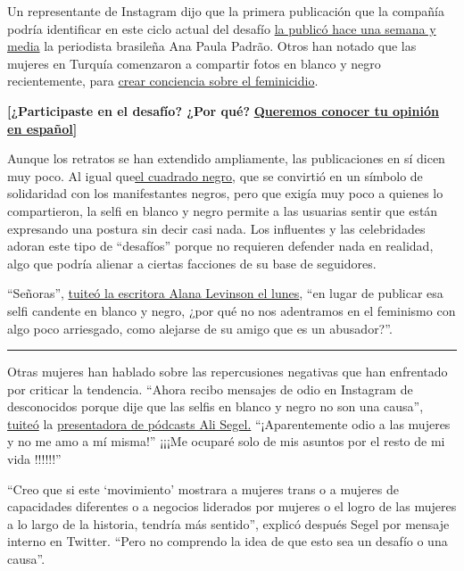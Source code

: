 Un representante de Instagram dijo que la primera publicación que la
compañía podría identificar en este ciclo actual del desafío
\href{https://www.instagram.com/p/CCxGfzTBmXP/}{la publicó hace una
semana y media} la periodista brasileña Ana Paula Padrão. Otros han
notado que las mujeres en Turquía comenzaron a compartir fotos en blanco
y negro recientemente, para
\href{https://twitter.com/imaann_patel/status/1288080743198068736?s=21}{crear
conciencia sobre el feminicidio}.

\textbf{{[}¿Participaste en el desafío? ¿Por qué?}
\textbf{\href{https://www.nytimes.com/es/2020/07/28/espanol/estilos-de-vida/reto-selfi-blanco-negro.html\#commentsContainer}{Queremos
conocer tu opinión en español{]}}}

Aunque los retratos se han extendido ampliamente, las publicaciones en
sí dicen muy poco. Al igual
que\href{https://www.nytimes.com/2020/06/02/arts/music/what-blackout-tuesday.html}{el
cuadrado negro}, que se convirtió en un símbolo de solidaridad con los
manifestantes negros, pero que exigía muy poco a quienes lo
compartieron, la selfi en blanco y negro permite a las usuarias sentir
que están expresando una postura sin decir casi nada. Los influentes y
las celebridades adoran este tipo de ``desafíos'' porque no requieren
defender nada en realidad, algo que podría alienar a ciertas facciones
de su base de seguidores.

``Señoras'',
\href{https://twitter.com/alanalevinson/status/1287818379818971136}{tuiteó
la escritora Alana Levinson el lunes}, ``en lugar de publicar esa selfi
candente en blanco y negro, ¿por qué no nos adentramos en el feminismo
con algo poco arriesgado, como alejarse de su amigo que es un
abusador?''.

\begin{center}\rule{0.5\linewidth}{\linethickness}\end{center}

Otras mujeres han hablado sobre las repercusiones negativas que han
enfrentado por criticar la tendencia. ``Ahora recibo mensajes de odio en
Instagram de desconocidos porque dije que las selfis en blanco y negro
no son una causa'',
\href{https://twitter.com/OnlineAlison/status/1287804859773677568}{tuiteó}
la \href{https://www.instagram.com/p/CDJw9mpgqc1/}{presentadora de
pódcasts Ali Segel.} ``¡Aparentemente odio a las mujeres y no me amo a
mí misma!'' ¡¡¡Me ocuparé solo de mis asuntos por el resto de mi vida
!!!!!!''

``Creo que si este `movimiento' mostrara a mujeres trans o a mujeres de
capacidades diferentes o a negocios liderados por mujeres o el logro de
las mujeres a lo largo de la historia, tendría más sentido'', explicó
después Segel por mensaje interno en Twitter. ``Pero no comprendo la
idea de que esto sea un desafío o una causa''.

